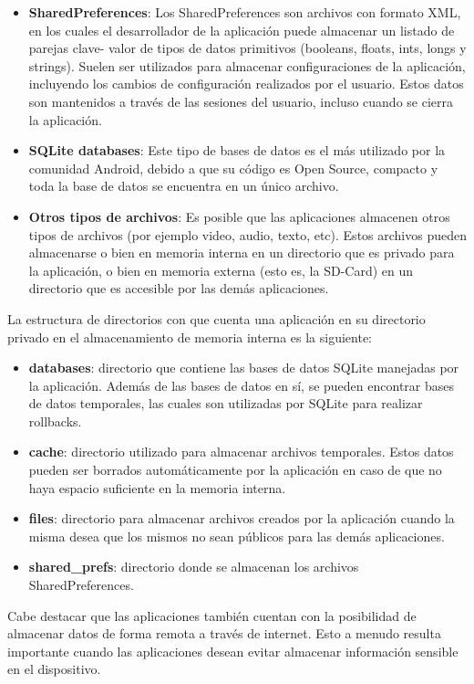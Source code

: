 \begin{itemize}
\item \textbf{SharedPreferences}: Los SharedPreferences son archivos con formato XML, en los cuales el desarrollador de la aplicación puede almacenar un listado de parejas clave- valor de tipos de datos primitivos (booleans, floats, ints, longs y strings). Suelen ser utilizados para almacenar configuraciones de la aplicación, incluyendo los cambios de configuración realizados por el usuario. Estos datos son mantenidos a través de las sesiones del usuario, incluso cuando se cierra la aplicación. 
\item \textbf{SQLite databases}: Este tipo de bases de datos es el más utilizado por la comunidad Android, debido a que su código es Open Source, compacto y toda la base de datos se encuentra en un único archivo. 
\item \textbf{Otros tipos de archivos}: Es posible que las aplicaciones almacenen otros tipos de archivos (por ejemplo video, audio, texto, etc). Estos archivos pueden almacenarse o bien en memoria interna en un directorio que es privado para la aplicación, o bien en memoria externa (esto es, la SD-Card) en un directorio que es accesible por las demás aplicaciones.
\end{itemize}

La estructura de directorios con que cuenta una aplicación en su directorio privado en el almacenamiento de memoria interna es la siguiente:

\begin{itemize}
\item \textbf{databases}: directorio que contiene las bases de datos SQLite manejadas por la aplicación. Además de las bases de datos en sí, se pueden encontrar bases de datos temporales, las cuales son utilizadas por SQLite para realizar rollbacks.
\item \textbf{cache}: directorio utilizado para almacenar archivos temporales. Estos datos pueden ser borrados automáticamente por la aplicación en caso de que no haya espacio suficiente en la memoria interna.
\item \textbf{files}: directorio para almacenar archivos creados por la aplicación cuando la misma desea que los mismos no sean públicos para las demás aplicaciones.
\item \textbf{shared\_prefs}: directorio donde se almacenan los archivos SharedPreferences.
\end{itemize}

Cabe destacar que las aplicaciones también cuentan con la posibilidad de almacenar datos de forma remota a través de internet. Esto a menudo resulta importante cuando las aplicaciones desean evitar almacenar información sensible en el dispositivo.

